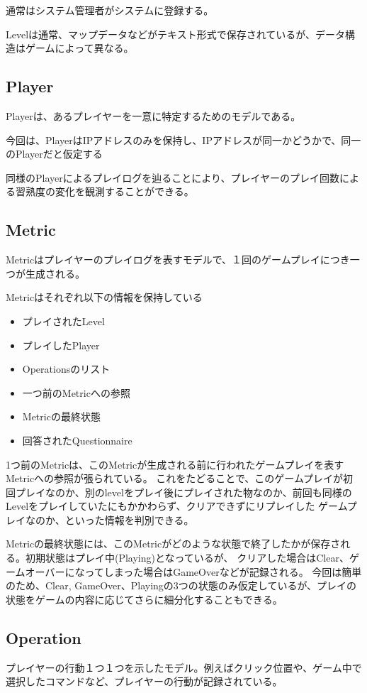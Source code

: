 通常はシステム管理者がシステムに登録する。

Levelは通常、マップデータなどがテキスト形式で保存されているが、データ構造はゲームによって異なる。

\subsection{Player}
Playerは、あるプレイヤーを一意に特定するためのモデルである。

今回は、PlayerはIPアドレスのみを保持し、IPアドレスが同一かどうかで、同一のPlayerだと仮定する


同様のPlayerによるプレイログを辿ることにより、プレイヤーのプレイ回数による習熟度の変化を観測することができる。

\subsection{Metric}
Metricはプレイヤーのプレイログを表すモデルで、１回のゲームプレイにつき一つが生成される。

Metricはそれぞれ以下の情報を保持している

\begin{itemize}
  \item プレイされたLevel
  \item プレイしたPlayer
  \item Operationsのリスト
  \item 一つ前のMetricへの参照
  \item Metricの最終状態
  \item 回答されたQuestionnaire
\end{itemize}

1つ前のMetricは、このMetricが生成される前に行われたゲームプレイを表すMetricへの参照が張られている。
これをたどることで、このゲームプレイが初回プレイなのか、別のlevelをプレイ後にプレイされた物なのか、前回も同様のLevelをプレイしていたにもかかわらず、クリアできずにリプレイした
ゲームプレイなのか、といった情報を判別できる。

Metricの最終状態には、このMetricがどのような状態で終了したかが保存される。初期状態はプレイ中(Playing)となっているが、
クリアした場合はClear、ゲームオーバーになってしまった場合はGameOverなどが記録される。
今回は簡単のため、Clear, GameOver、Playingの3つの状態のみ仮定しているが、プレイの状態をゲームの内容に応じてさらに細分化することもできる。

\subsection{Operation}
プレイヤーの行動１つ１つを示したモデル。例えばクリック位置や、ゲーム中で選択したコマンドなど、プレイヤーの行動が記録されている。

